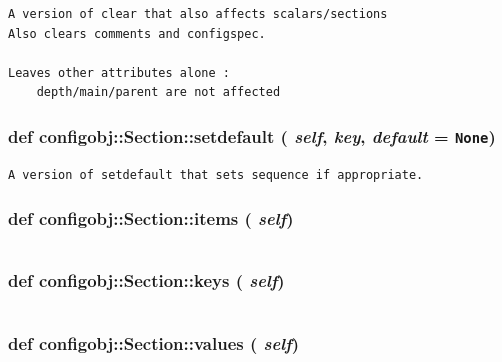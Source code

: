 \footnotesize\begin{verbatim}
A version of clear that also affects scalars/sections
Also clears comments and configspec.

Leaves other attributes alone :
    depth/main/parent are not affected
\end{verbatim}
\normalsize
\subsubsection{\setlength{\rightskip}{0pt plus 5cm}def configobj::Section::setdefault ( {\em self},  {\em key},  {\em default} = {\tt None})}\label{classconfigobj_1_1Section_a7d355edde41d9d53841d9067cf22094}




\footnotesize\begin{verbatim}A version of setdefault that sets sequence if appropriate.\end{verbatim}
\normalsize
\subsubsection{\setlength{\rightskip}{0pt plus 5cm}def configobj::Section::items ( {\em self})}\label{classconfigobj_1_1Section_2dc9efcd670db60d80f7b5ecb4b73176}




\footnotesize\begin{verbatim}\end{verbatim}
\normalsize
\subsubsection{\setlength{\rightskip}{0pt plus 5cm}def configobj::Section::keys ( {\em self})}\label{classconfigobj_1_1Section_2104f40dfd98abe904faa716497f5b9e}




\footnotesize\begin{verbatim}\end{verbatim}
\normalsize
\subsubsection{\setlength{\rightskip}{0pt plus 5cm}def configobj::Section::values ( {\em self})}\label{classconfigobj_1_1Section_b7a0c15d82e82b4a63083604b1cf2d91}




